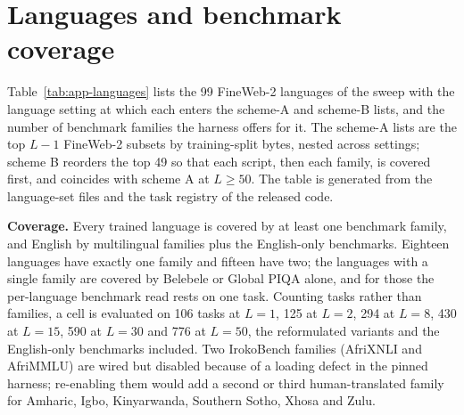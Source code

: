 \section{Languages and benchmark coverage}
\label{app:languages}

Table~\ref{tab:app-languages} lists the 99 FineWeb-2 languages of the sweep with the language setting at which each enters the scheme-A and scheme-B lists, and the number of benchmark families the harness offers for it. The scheme-A lists are the top $L-1$ FineWeb-2 subsets by training-split bytes, nested across settings; scheme B reorders the top 49 so that each script, then each family, is covered first, and coincides with scheme A at $L \geq 50$. The table is generated from the language-set files and the task registry of the released code.



\label{app:benchmark-coverage}
\textbf{Coverage.} Every trained language is covered by at least one benchmark family, and English by  multilingual families plus the English-only benchmarks. Eighteen languages have exactly one family and fifteen have two; the languages with a single family are covered by Belebele or Global PIQA alone, and for those the per-language benchmark read rests on one task. Counting tasks rather than families, a cell is evaluated on 106 tasks at $L=1$, 125 at $L=2$, 294 at $L=8$, 430 at $L=15$, 590 at $L=30$ and 776 at $L=50$, the reformulated variants and the English-only benchmarks included. Two IrokoBench families (AfriXNLI and AfriMMLU) are wired but disabled because of a loading defect in the pinned harness; re-enabling them would add a second or third human-translated family for Amharic, Igbo, Kinyarwanda, Southern Sotho, Xhosa and Zulu.

